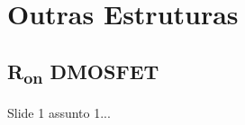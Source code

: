 \section{Outras Estruturas}

\subsection{R\textsubscript{on} DMOSFET}

\begin{frame}

    Slide 1 assunto 1...

\end{frame}

